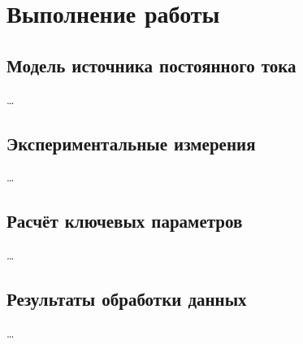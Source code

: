 \section{Выполнение работы}

\subsection{Модель источника постоянного тока}

\dots

\subsection{Экспериментальные измерения}

\dots

\subsection{Расчёт ключевых параметров}

\dots

\subsection{Результаты обработки данных}

\dots